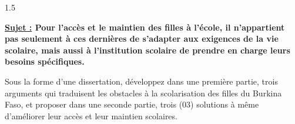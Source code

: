 \documentclass[12pt]{article}
\begin{document}
\begin{spacing}{1.5}

\textbf{\underline{Sujet :} Pour l'accès et le maintien des filles à l'école, il n'appartient pas seulement à ces dernières de s'adapter aux exigences de la vie scolaire, mais aussi à l'institution scolaire de prendre en charge leurs besoins spécifiques.}

\quad Sous la forme d'une dissertation, développez dans une première partie, trois arguments qui traduisent les obstacles à la scolarisation des filles du Burkina Faso, et proposer dans une seconde partie, trois (03) solutions à même d'améliorer leur accès et leur maintien scolaires.


\quad

\end{spacing}
\end{document}
